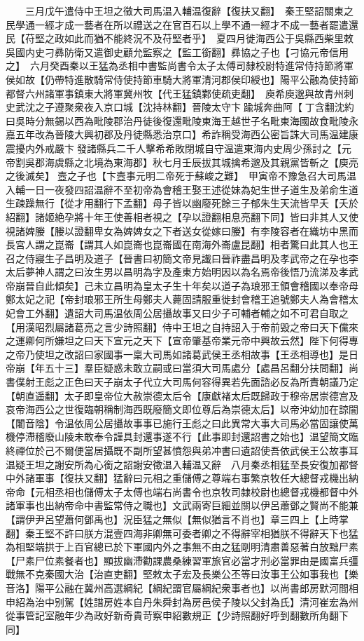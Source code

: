 　　三月戊午遣侍中王坦之徵大司馬温入輔温復辭【復扶又翻】　秦王堅詔關東之民學通一經才成一藝者在所以禮送之在官百石以上學不通一經才不成一藝者罷遣還民【苻堅之政如此而猶不能終況不及苻堅者乎】　夏四月徙海西公于吳縣西柴里敕吳國内史刁彞防衛又遣御史顧允監察之【監工銜翻】彞協之子也【刁協元帝信用之】　六月癸酉秦以王猛為丞相中書監尚書令太子太傅司隸校尉特進常侍持節將軍侯如故【仍帶特進散騎常侍使持節車騎大將軍清河郡侯印綬也】陽平公融為使持節都督六州諸軍事鎮東大將軍冀州牧【代王猛鎮鄴使疏吏翻】　庾希庾邈與故青州刺史武沈之子遵聚衆夜入京口城【沈持林翻】晉陵太守卞踰城奔曲阿【丁含翻沈約曰吳時分無錫以西為毗陵郡治丹徒後復還毗陵東海王越世子名毗東海國故食毗陵永嘉五年改為晉陵大興初郡及丹徒縣悉治京口】希詐稱受海西公密旨誅大司馬温建康震擾内外戒嚴卞發諸縣兵二千人擊希希敗閉城自守温遣東海内史周少孫討之【元帝割吳郡海虞縣之北境為東海郡】秋七月壬辰拔其城擒希邈及其親黨皆斬之【庾亮之後滅矣】壼之子也【卞壼事元明二帝死于蘇峻之難】　甲寅帝不豫急召大司馬温入輔一日一夜發四詔温辭不至初帝為會稽王娶王述從妹為妃生世子道生及弟俞生道生疎躁無行【從才用翻行下孟翻】母子皆以幽廢死餘三子郁朱生天流皆早夭【夭於紹翻】諸姬絶孕將十年王使善相者視之【孕以證翻相息亮翻下同】皆曰非其人又使視諸婢媵【媵以證翻卑女為婢婢女之下者送女從嫁曰媵】有李陵容者在織坊中黑而長宮人謂之崑崙【謂其人如崑崙也崑崙國在南海外崙盧昆翻】相者驚曰此其人也王召之侍寢生子昌明及道子【晉書曰初簡文帝見䜟曰晉祚盡昌明及孝武帝之在孕也李太后夢神人謂之曰汝生男以昌明為字及產東方始明因以為名焉帝後悟乃流涕及孝武帝崩晉自此傾矣】己未立昌明為皇太子生十年矣以道子為琅邪王領會稽國以奉帝母鄭太妃之祀【帝封琅邪王所生母鄭夫人薨固請服重徙封會稽王追號鄭夫人為會稽太妃會工外翻】遺詔大司馬温依周公居攝故事又曰少子可輔者輔之如不可君自取之【用漢昭烈屬諸葛亮之言少詩照翻】侍中王坦之自持詔入于帝前毁之帝曰天下儻來之運卿何所嫌坦之曰天下宣元之天下【宣帝肇基帝業元帝中興故云然】陛下何得專之帝乃使坦之改詔曰家國事一稟大司馬如諸葛武侯王丞相故事【王丞相導也】是日帝崩【年五十三】羣臣疑惑未敢立嗣或曰當須大司馬處分【處昌呂翻分扶問翻】尚書僕射王彪之正色曰天子崩太子代立大司馬何容得異若先面諮必反為所責朝議乃定【朝直遥翻】太子即皇帝位大赦崇德太后令【康獻褚太后既歸政于穆帝居崇德宫及哀帝海西公之世復臨朝稱制海西既廢簡文即位尊后為崇德太后】以帝沖幼加在諒闇【闍音陰】令温依周公居攝故事事已施行王彪之曰此異常大事大司馬必當固讓使萬機停滯稽廢山陵未敢奉令謹具封還事遂不行【此事即封還詔書之始也】温望簡文臨終禪位於己不爾便當居攝既不副所望甚憤怨與弟冲書曰遺詔使吾依武侯王公故事耳温疑王坦之謝安所為心銜之詔謝安徵温入輔温又辭　八月秦丞相猛至長安復加都督中外諸軍事【復扶又翻】猛辭曰元相之重儲傅之尊端右事繁京牧任大總督戎機出納帝命【元相丞相也儲傅太子太傅也端右尚書令也京牧司隸校尉也總督戎機都督中外諸軍事也出納帝命中書監常侍之職也】文武兩寄巨細並關以伊呂蕭鄧之賢尚不能兼【謂伊尹呂望蕭何鄧禹也】況臣猛之無似【無似猶言不肖也】章三四上【上時掌翻】秦王堅不許曰朕方混壹四海非卿無可委者卿之不得辭宰相猶朕不得辭天下也猛為相堅端拱于上百官總已於下軍國内外之事無不由之猛剛明清肅善惡著白放黜尸素【尸素尸位素餐者也】顯拔幽滯勸課農桑練習軍旅官必當才刑必當罪由是國富兵彊戰無不克秦國大治【治直吏翻】堅敕太子宏及長樂公丕等曰汝事王公如事我也【樂音洛】陽平公融在冀州高選綱紀【綱紀謂官屬綱紀衆事者也】以尚書郎房默河間相申紹為治中别駕【姓譜房姓本自丹朱舜封為房邑侯子陵以父封為氏】清河崔宏為州從事管記室融年少為政好新奇貴苛察申紹數規正【少詩照翻好呼到翻數所角翻下同】